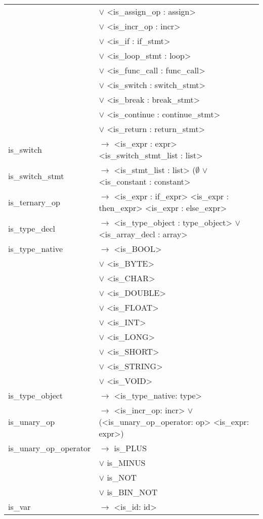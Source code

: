 \documentclass[a4paper]{article}
\begin{document}
\begin{tabular}{ll}
								& $\vee$ <is\_assign\_op : assign> \\
								& $\vee$ <is\_incr\_op : incr> \\
								& $\vee$ <is\_if : if\_stmt> \\
								& $\vee$ <is\_loop\_stmt : loop> \\
								& $\vee$ <is\_func\_call : func\_call> \\
								& $\vee$ <is\_switch : switch\_stmt> \\
								& $\vee$ <is\_break : break\_stmt> \\
								& $\vee$ <is\_continue : continue\_stmt> \\
								& $\vee$ <is\_return : return\_stmt> \\
	is\_switch					& $\to$ <is\_expr : expr> <is\_switch\_stmt\_list : list> \\
	is\_switch\_stmt			& $\to$ <is\_stmt\_list : list> ($\emptyset$ $\vee$ <is\_constant : constant> \\
	is\_ternary\_op				& $\to$ <is\_expr : if\_expr> <is\_expr : then\_expr> <is\_expr : else\_expr> \\
	is\_type\_decl				& $\to$ <is\_type\_object : type\_object> $\vee$ <is\_array\_decl : array> \\
	is\_type\_native			& $\to$ <is\_BOOL> \\
								& $\vee$ <is\_BYTE> \\
								& $\vee$ <is\_CHAR> \\
								& $\vee$ <is\_DOUBLE> \\
								& $\vee$ <is\_FLOAT> \\
								& $\vee$ <is\_INT> \\
								& $\vee$ <is\_LONG> \\
								& $\vee$ <is\_SHORT> \\
								& $\vee$ <is\_STRING> \\
								& $\vee$ <is\_VOID> \\
	is\_type\_object			& $\to$ <is\_type\_native: type> \\
	is\_unary\_op				& $\to$ <is\_incr\_op: incr> $\vee$ (<is\_unary\_op\_operator: op> <is\_expr: expr>) \\
	is\_unary\_op\_operator		& $\to$ is\_PLUS \\
								& $\vee$ is\_MINUS \\
								& $\vee$ is\_NOT \\
								& $\vee$ is\_BIN\_NOT \\
	is\_var					 	& $\to$ <is\_id: id> \\

\end{tabular}
\end{document}
